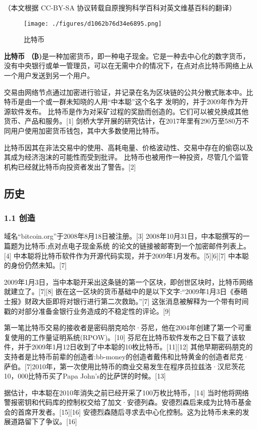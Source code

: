 
（本文根据 CC-BY-SA 协议转载自原搜狗科学百科对英文维基百科的翻译）
\begin{figure}[ht]
\centering
\texttt{[image: ./figures/d1062b76d34e6895.png]}
\caption{比特币} \label{fig_BTC_11}
\end{figure}
\textbf{比特币 （₿)}是一种加密货币，即一种电子现金。它是一种去中心化的数字货币，没有中央银行或单一管理员，可以在无需中介的情况下，在点对点比特币网络上从一个用户发送到另一个用户。

交易由网络节点通过加密进行验证，并记录在名为区块链的公共分散式账本中。比特币是由一个或一群未知晓的人用“中本聪”这个名字 发明的，并于2009年作为开源软件发布。 比特币是作为对采矿过程的奖励而创造的。它们可以被兑换成其他货币、产品和服务。[1] 剑桥大学开展的研究估计，在2017年里有290万至580万不同用户使用加密货币钱包，其中大多数使用比特币。

比特币因其在非法交易中的使用、高耗电量、价格波动性、交易中存在的偷窃以及其成为经济泡沫的可能性而受到批评。 比特币也被用作一种投资，尽管几个监管机构已经就比特币向投资者发出了警告。[2]

\subsection{历史}
\subsubsection{1.1 创造}
域名“bitcoin.org”于2008年8月18日被注册。[3] 2008年10月31日，中本聪撰写的一篇题为比特币:点对点电子现金系统 的论文的链接被邮寄到一个加密邮件列表上。[4] 中本聪将比特币软件作为开源代码实现，并于2009年1月发布。[5][6][7] 中本聪的身份仍然未知。[7]

2009年1月3日，当中本聪开采出这条链的第一个区块，即创世区块时，比特币网络就建立了。[7][8] 嵌在这一区块的货币基础中的是以下文字:“2009年1月3日《泰晤士报》财政大臣即将对银行进行第二次救助。”[7] 这张消息被解释为一个带有时间戳的对部分准备金银行业务造成的不稳定性的评论。[9]

第一笔比特币交易的接收者是密码朋克哈尔·芬尼，他在2004年创建了第一个可重复使用的工作量证明系统(RPOW)。[10] 芬尼在比特币软件发布之日下载了该软件，并于2009年1月12日收到了中本聪的10枚比特币。[11][12] 其他早期密码朋克的支持者是比特币前辈的创造者:bb-money的创造者戴伟和比特黄金的创造者尼克·萨伯。[7]2010年，第一次使用比特币的商业交易发生在程序员拉兹洛·汉尼茨花10，000比特币买了Papa John's的比萨饼的时候。[13]

据估计，中本聪在2010年消失之前已经开采了100万枚比特币，[14] 当时他将网络警报密钥和代码库的控制权交给了加文·安德列森。安德烈森后来成为比特币基金会的首席开发者。[15][16] 安德烈森随后寻求去中心化控制。这为比特币未来的发展道路留下了争议。[16]
